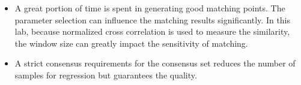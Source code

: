 \documentclass[paper=a4, fontsize=11pt]{scrartcl}
\begin{document}
\begin{itemize}
\item A great portion of time is spent in generating good matching points.
The parameter selection can influence the matching results significantly.
In this lab, because normalized cross correlation is used to measure the similarity, the window size can greatly impact the sensitivity of matching.
\item A strict consensus requirements for the consensus set reduces the number of samples for regression but guarantees the quality.
\end{itemize}




\end{document}
